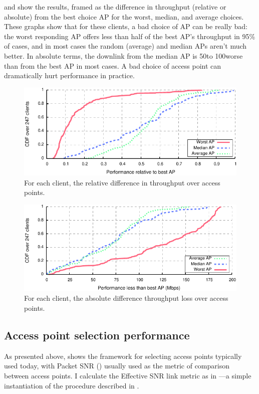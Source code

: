  and  show the results, framed as the difference in throughput (relative or absolute) from the best choice AP for the worst, median, and average choices. These graphs show that for these clients, a bad choice of AP can be really bad: the worst responding AP offers less than half of the best AP's throughput in 95\% of cases, and in most cases the random (average) and median APs aren't much better. In absolute terms, the downlink from the median AP is 50\Mbps to 100\Mbps worse than from the best AP in most cases. A bad choice of access point can dramatically hurt performance in practice.

\begin{figure}[t]
	\centering
	\includegraphics[width=\textwidth]{figures/applications/ap_sel_rel_diff.pdf}
	\caption{\label{fig:ap_sel_rel_diff}For each client, the relative difference in throughput over access points.}
\end{figure}

\begin{figure}[t]
	\centering
	\includegraphics[width=\textwidth]{figures/applications/ap_sel_tpt_diff.pdf}
	\caption{\label{fig:ap_sel_tpt_diff}For each client, the absolute difference throughput loss over access points.}
\end{figure}

\subsection{Access point selection performance}
As presented above,  shows the framework for selecting access points typically used today, with Packet SNR () usually used as the metric of comparison between access points. I calculate the Effective SNR link metric as in ---a simple instantiation of the procedure described in . 

